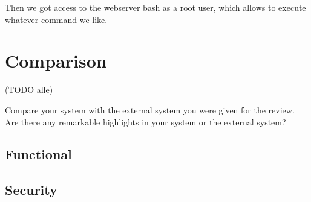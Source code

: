 \documentclass[english]{article}
\begin{document}
Then we got access to the webserver bash as a root user, which allows to execute whatever command we like.

\section{Comparison} (TODO alle)

Compare your system with the external system you were given for the review. Are there any remarkable highlights in your system or the external system?

\subsection{Functional}

\subsection{Security}
\end{document}
